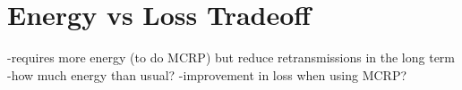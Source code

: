 \chapter{Energy vs Loss Tradeoff}
\label{energyLoss}

-requires more energy (to do MCRP) but reduce retransmissions in the long term
-how much energy than usual?
-improvement in loss when using MCRP?